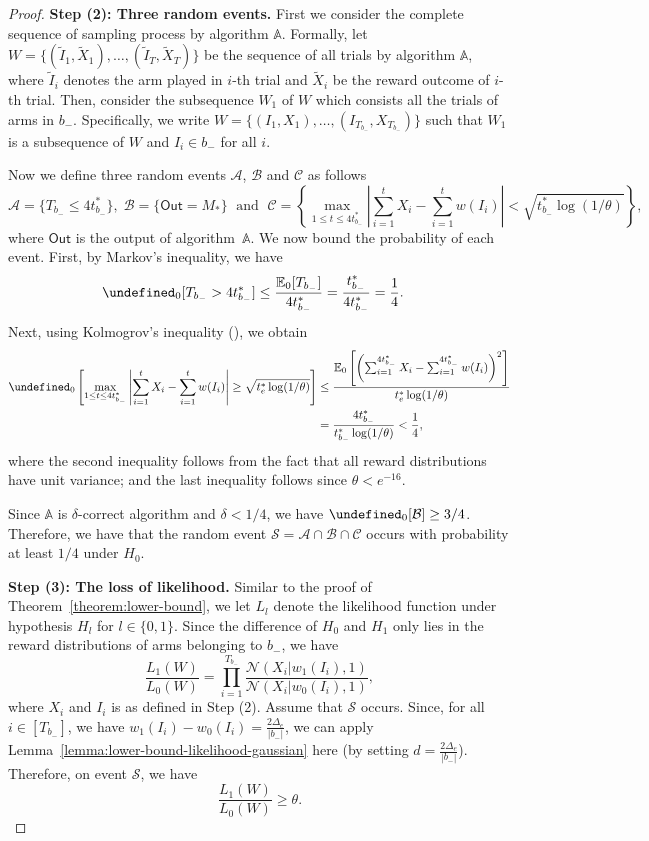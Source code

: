 \documentclass{article}
\newcommand{\E}{\mathbb E}
\newcommand{\out}{\mathsf{Out}}
\let\Pr\undefined
\DeclareMathOperator{\Pr}{Pr}
\begin{document}
\begin{proof}
\textbf{Step (2): Three random events.}
First we consider the complete sequence of sampling process by algorithm $\mathbb A$.
Formally, let $W=\{(\tilde I_1,\tilde X_1),\ldots, (\tilde I_T, \tilde X_T)\}$ be the sequence of all trials by algorithm $\mathbb A$, where $\tilde I_i$ denotes the arm played in $i$-th trial and $\tilde X_i$ be the reward outcome of $i$-th trial.
Then, consider the subsequence $W_1$ of $W$ which consists all the trials of arms in $b_-$.
Specifically, we write $W=\{(I_1,X_1),\ldots,(I_{T_{b_-}}, X_{T_{b_-}})\}$ such that $W_1$ is a subsequence of $W$ and $I_i \in b_-$ for all $i$.

Now we  define three random events $\mathcal A$, $\mathcal B$ and $\mathcal C$ as follows
$$
\mathcal A = \{T_{b_-} \le 4t_{b_-}^* \},\;\mathcal B=\{\out=M_*\}\;\text{ and }\;
\mathcal C=\left\{\max_{1\le t \le 4t_{b_-}^*} \left|\sum_{i=1}^t X_i -\sum_{i=1}^t w(I_i)\right|  < \sqrt{t_{b_-}^*\log(1/\theta)} \right\},
$$
where $\out$ is the output of algorithm~$\mathbb A$. We now bound the probability of each event.
First, by Markov's inequality, we have
\begin{align*}
\Pr_0[T_{b_-} > 4t_{b_-}^*] &\le \frac{\E_0[T_{b_-}]}{4t_{b_-}^*} = \frac{t_{b_-}^*}{4t_{b_-}^*} = \frac14.
\end{align*}
Next, using Kolmogrov's inequality (), we obtain
\begin{align*}
\Pr_0\left[\max_{1\le t \le 4t_{b_-}^*} \left|\sum_{i=1}^t X_i - \sum_{i=1}^t w(I_i) \right| \ge \sqrt{t_e^*\log(1/\theta)} \right]
&\le \frac{\E_0\left[ \left(\sum_{i=1}^{4t_{b_-}^*} X_i - \sum_{i=1}^{4t_{b_-}^*} w(I_i)\right)^2\right]}{t_e^*\log(1/\theta)}\\
&= \frac{4t_{b_-}^*}{t_{b_-}^*\log(1/\theta)} < \frac14,
\end{align*}
where the second inequality follows from the fact that all reward distributions have unit variance; and the last inequality follows 
since $\theta < e^{-16}$.


Since $\mathbb A$ is $\delta$-correct algorithm and $\delta < 1/4$, we have $\Pr_0[\mathcal B]\ge 3/4$. Therefore, we have that the random event $\mathcal S=\mathcal A \cap \mathcal B \cap \mathcal C$ occurs with probability at least $1/4$ under $H_0$.


\textbf{Step (3): The loss of likelihood.} Similar to the proof of Theorem~\ref{theorem:lower-bound}, we let $L_l$ denote the likelihood function under hypothesis $H_l$ for $l\in\{0,1\}$. 
Since the difference of $H_0$ and $H_1$ only lies in the reward distributions of arms belonging to $b_-$, we have
$$
\frac{L_1(W)}{L_0(W)} = \prod_{i=1}^{T_{b_-}} \frac{\mathcal N(X_i | w_1(I_i), 1)}{\mathcal N(X_i | w_0(I_i), 1)},
$$
where $X_i$ and $I_i$ is as defined in Step (2).
Assume that $\mathcal S$ occurs.
Since, for all $i \in [T_{b_-}]$, we have $w_1(I_i)-w_0(I_i) = \frac{2\Delta_e}{|b_-|}$, we can apply Lemma~\ref{lemma:lower-bound-likelihood-gaussian} here (by setting $d=\frac{2\Delta_e}{|b_-|}$).
Therefore, on event $\mathcal S$, we have
$$
\frac{L_1(W)}{L_0(W)} \ge \theta.
$$


\end{proof}
\end{document}

